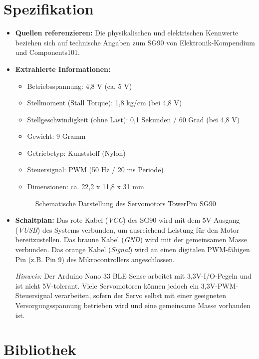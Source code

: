 \section{Spezifikation}
\begin{itemize}
	\item \textbf{Quellen referenzieren:} Die physikalischen und elektrischen Kennwerte beziehen sich auf technische Angaben zum SG90 von Elektronik-Kompendium und Components101.\cite{Elektronik:2026,Components101:2026}
	\item \textbf{Extrahierte Informationen:}
	\begin{itemize}
		\item Betriebsspannung: 4,8 V (ca. 5 V)
		\item Stellmoment (Stall Torque): 1,8 kg/cm (bei 4,8 V)
		\item Stellgeschwindigkeit (ohne Last): 0,1 Sekunden / 60 Grad (bei 4,8 V)
		\item Gewicht: 9 Gramm
		\item Getriebetyp: Kunststoff (Nylon)
		\item Steuersignal: PWM (50 Hz / 20 ms Periode)
		\item Dimensionen: ca. 22,2 x 11,8 x 31 mm 
	\end{itemize}
	
	\begin{figure}[htbp]
		\centering
		
		\caption{Schematische Darstellung des Servomotors TowerPro SG90}
		\label{fig:sg90_tikz}
	\end{figure}
	
	\item \textbf{Schaltplan:} Das rote Kabel (\textit{VCC}) des SG90 wird mit dem 5V-Ausgang (\textit{VUSB}) des Systems verbunden, um ausreichend Leistung für den Motor bereitzustellen. Das braune Kabel (\textit{GND}) wird mit der gemeinsamen Masse verbunden. Das orange Kabel (\textit{Signal}) wird an einen digitalen PWM-fähigen Pin (z.B. Pin 9) des Mikrocontrollers angeschlossen.\cite{Elektronik:2026} 
	
	\textit{Hinweis:} Der Arduino Nano 33 BLE Sense arbeitet mit 3,3V-I/O-Pegeln und ist nicht 5V-tolerant.\cite{ArduinoNano:2026} 
	Viele Servomotoren können jedoch ein 3,3V-PWM-Steuersignal verarbeiten, sofern der Servo selbst mit einer geeigneten Versorgungsspannung betrieben wird und eine gemeinsame Masse vorhanden ist.\cite{DroneBot:2026}
\end{itemize}

\section{Bibliothek}

